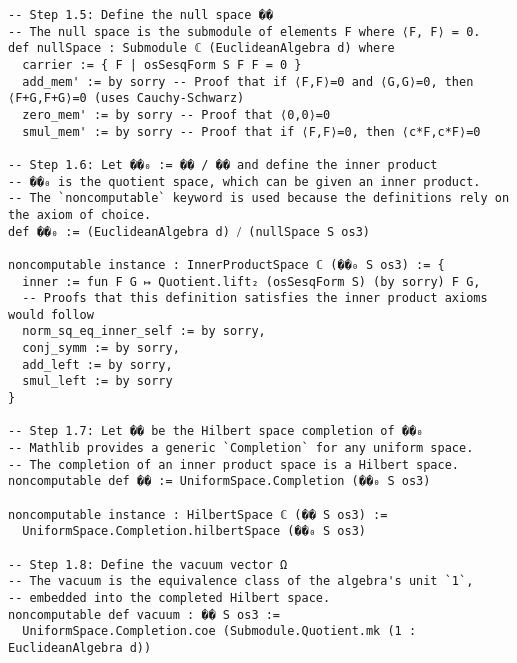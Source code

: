 \documentclass{article}
\begin{document}
\begin{lstlisting}
-- Step 1.5: Define the null space ��
-- The null space is the submodule of elements F where ⟨F, F⟩ = 0.
def nullSpace : Submodule ℂ (EuclideanAlgebra d) where
  carrier := { F | osSesqForm S F F = 0 }
  add_mem' := by sorry -- Proof that if ⟨F,F⟩=0 and ⟨G,G⟩=0, then ⟨F+G,F+G⟩=0 (uses Cauchy-Schwarz)
  zero_mem' := by sorry -- Proof that ⟨0,0⟩=0
  smul_mem' := by sorry -- Proof that if ⟨F,F⟩=0, then ⟨c*F,c*F⟩=0

-- Step 1.6: Let ��₀ := �� / �� and define the inner product
-- ��₀ is the quotient space, which can be given an inner product.
-- The `noncomputable` keyword is used because the definitions rely on the axiom of choice.
def ��₀ := (EuclideanAlgebra d) ⧸ (nullSpace S os3)

noncomputable instance : InnerProductSpace ℂ (��₀ S os3) := {
  inner := fun F G ↦ Quotient.lift₂ (osSesqForm S) (by sorry) F G,
  -- Proofs that this definition satisfies the inner product axioms would follow
  norm_sq_eq_inner_self := by sorry,
  conj_symm := by sorry,
  add_left := by sorry,
  smul_left := by sorry
}

-- Step 1.7: Let �� be the Hilbert space completion of ��₀
-- Mathlib provides a generic `Completion` for any uniform space.
-- The completion of an inner product space is a Hilbert space.
noncomputable def �� := UniformSpace.Completion (��₀ S os3)

noncomputable instance : HilbertSpace ℂ (�� S os3) :=
  UniformSpace.Completion.hilbertSpace (��₀ S os3)

-- Step 1.8: Define the vacuum vector Ω
-- The vacuum is the equivalence class of the algebra's unit `1`,
-- embedded into the completed Hilbert space.
noncomputable def vacuum : �� S os3 :=
  UniformSpace.Completion.coe (Submodule.Quotient.mk (1 : EuclideanAlgebra d))
\end{lstlisting}



\end{document}
